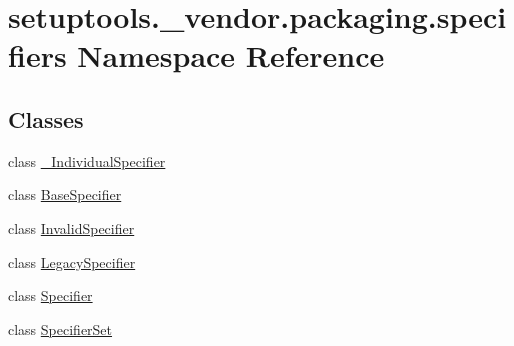 \hypertarget{namespacesetuptools_1_1__vendor_1_1packaging_1_1specifiers}{}\section{setuptools.\+\_\+vendor.\+packaging.\+specifiers Namespace Reference}
\label{namespacesetuptools_1_1__vendor_1_1packaging_1_1specifiers}
\subsection*{Classes}
\begin{DoxyCompactItemize}
\item 
class \hyperlink{classsetuptools_1_1__vendor_1_1packaging_1_1specifiers_1_1___individual_specifier}{\+\_\+\+Individual\+Specifier}
\item 
class \hyperlink{classsetuptools_1_1__vendor_1_1packaging_1_1specifiers_1_1_base_specifier}{Base\+Specifier}
\item 
class \hyperlink{classsetuptools_1_1__vendor_1_1packaging_1_1specifiers_1_1_invalid_specifier}{Invalid\+Specifier}
\item 
class \hyperlink{classsetuptools_1_1__vendor_1_1packaging_1_1specifiers_1_1_legacy_specifier}{Legacy\+Specifier}
\item 
class \hyperlink{classsetuptools_1_1__vendor_1_1packaging_1_1specifiers_1_1_specifier}{Specifier}
\item 
class \hyperlink{classsetuptools_1_1__vendor_1_1packaging_1_1specifiers_1_1_specifier_set}{Specifier\+Set}
\end{DoxyCompactItemize}
